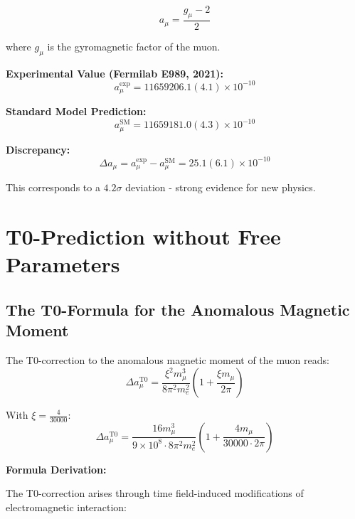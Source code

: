 \documentclass[12pt,a4paper]{report}
\newcommand{\xipar}{\xi}      %
\begin{document}
	\begin{equation}\label{eq:anomalous_moment_definition}
		a_\mu = \frac{g_\mu - 2}{2}
	\end{equation}
	
	where $g_\mu$ is the gyromagnetic factor of the muon.
	
	\textbf{Experimental Value (Fermilab E989, 2021):}
	\begin{equation}\label{eq:experimental_value}
		a_\mu^{\text{exp}} = 11659206.1(4.1) \times 10^{-10}
	\end{equation}
	
	\textbf{Standard Model Prediction:}
	\begin{equation}\label{eq:sm_prediction}
		a_\mu^{\text{SM}} = 11659181.0(4.3) \times 10^{-10}
	\end{equation}
	
	\textbf{Discrepancy:}
	\begin{equation}\label{eq:discrepancy}
		\Delta a_\mu = a_\mu^{\text{exp}} - a_\mu^{\text{SM}} = 25.1(6.1) \times 10^{-10}
	\end{equation}
	
	This corresponds to a $4.2\sigma$ deviation - strong evidence for new physics.
	
	\section{T0-Prediction without Free Parameters}\label{sec:t0_prediction}

\subsection{The T0-Formula for the Anomalous Magnetic Moment}\label{subsec:t0_formula}

The T0-correction to the anomalous magnetic moment of the muon reads:
\begin{equation}
	\Delta a_\mu^{\text{T0}} = \frac{\xipar^2 m_\mu^3}{8\pi^2 m_e^2} \left(1 + \frac{\xipar m_\mu}{2\pi}\right)
\end{equation}

With $\xipar = \frac{4}{30000}$:
\begin{equation}
	\Delta a_\mu^{\text{T0}} = \frac{16 m_\mu^3}{9 \times 10^8 \cdot 8\pi^2 m_e^2} \left(1 + \frac{4 m_\mu}{30000 \cdot 2\pi}\right)
\end{equation}

\textbf{Formula Derivation:}

The T0-correction arises through time field-induced modifications of electromagnetic interaction:
\end{document}
